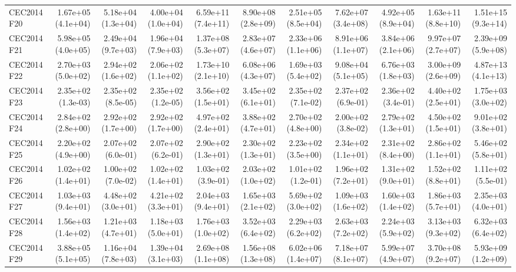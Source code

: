 \begin{longtable}{lrrrrrrrrrr}
CEC2014 F20 & 1.67e+05 (4.1e+04) & 5.18e+04 (1.3e+04) & 4.00e+04 (1.0e+04) & 6.59e+11 (7.4e+11) & 8.90e+08 (2.8e+09) & 2.51e+05 (8.5e+04) & 7.62e+07 (3.4e+08) & 4.92e+05 (8.9e+04) & 1.63e+11 (8.8e+10) & 1.51e+15 (9.3e+14) \\
CEC2014 F21 & 5.98e+05 (4.0e+05) & 2.49e+04 (9.7e+03) & 1.96e+04 (7.9e+03) & 1.37e+08 (5.3e+07) & 2.83e+07 (4.6e+07) & 2.33e+06 (1.1e+06) & 8.91e+06 (1.1e+07) & 3.84e+06 (2.1e+06) & 9.97e+07 (2.7e+07) & 2.39e+09 (5.9e+08) \\
CEC2014 F22 & 2.70e+03 (5.0e+02) & 2.94e+02 (1.6e+02) & 2.06e+02 (1.1e+02) & 1.73e+10 (2.1e+10) & 6.08e+06 (4.3e+07) & 1.69e+03 (5.4e+02) & 9.08e+04 (5.1e+05) & 6.76e+03 (1.8e+03) & 3.00e+09 (2.6e+09) & 4.87e+13 (4.1e+13) \\
CEC2014 F23 & 2.35e+02 (1.3e-03) & 2.35e+02 (8.5e-05) & 2.35e+02 (1.2e-05) & 3.56e+02 (1.5e+01) & 3.45e+02 (6.1e+01) & 2.35e+02 (7.1e-02) & 2.37e+02 (6.9e-01) & 2.36e+02 (3.4e-01) & 4.40e+02 (2.5e+01) & 1.75e+03 (3.0e+02) \\
CEC2014 F24 & 2.84e+02 (2.8e+00) & 2.92e+02 (1.7e+00) & 2.92e+02 (1.7e+00) & 4.97e+02 (2.4e+01) & 3.88e+02 (4.7e+01) & 2.70e+02 (4.8e+00) & 2.00e+02 (3.8e-02) & 2.79e+02 (1.3e+01) & 4.50e+02 (1.5e+01) & 9.01e+02 (3.8e+01) \\
CEC2014 F25 & 2.20e+02 (4.9e+00) & 2.07e+02 (6.0e-01) & 2.07e+02 (6.2e-01) & 2.90e+02 (1.3e+01) & 2.30e+02 (1.3e+01) & 2.23e+02 (3.5e+00) & 2.34e+02 (1.1e+01) & 2.31e+02 (8.4e+00) & 2.86e+02 (1.1e+01) & 5.46e+02 (5.8e+01) \\
CEC2014 F26 & 1.02e+02 (1.4e+01) & 1.00e+02 (7.0e-02) & 1.02e+02 (1.4e+01) & 1.03e+02 (3.9e-01) & 2.03e+02 (1.0e+02) & 1.01e+02 (1.2e-01) & 1.96e+02 (7.2e+01) & 1.31e+02 (9.0e+01) & 1.52e+02 (8.8e+01) & 1.11e+02 (5.5e-01) \\
CEC2014 F27 & 1.03e+03 (9.4e+01) & 4.48e+02 (3.0e+01) & 4.21e+02 (3.3e+01) & 2.04e+03 (9.4e+01) & 1.65e+03 (2.1e+02) & 5.69e+02 (3.0e+02) & 1.09e+03 (1.6e+02) & 1.60e+03 (1.4e+02) & 1.86e+03 (5.7e+01) & 2.35e+03 (4.0e+01) \\
CEC2014 F28 & 1.56e+03 (1.4e+02) & 1.21e+03 (4.7e+01) & 1.18e+03 (5.0e+01) & 1.76e+03 (1.0e+02) & 3.52e+03 (6.4e+02) & 2.29e+03 (6.2e+02) & 2.63e+03 (7.2e+02) & 2.24e+03 (5.9e+02) & 3.13e+03 (9.3e+02) & 6.32e+03 (6.4e+02) \\
CEC2014 F29 & 3.88e+05 (5.1e+05) & 1.16e+04 (7.8e+03) & 1.39e+04 (3.1e+03) & 2.69e+08 (1.1e+08) & 1.56e+08 (1.3e+08) & 6.02e+06 (1.4e+07) & 7.18e+07 (8.1e+07) & 5.99e+07 (4.9e+07) & 3.70e+08 (9.2e+07) & 5.93e+09 (1.2e+09) \\

\end{longtable}
